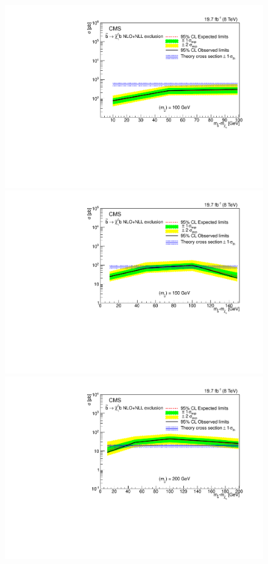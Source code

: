\begin{figure}[!Hhtb]
  \begin{center}
  \includegraphics[scale=0.39]{Figures/sus13009/sbottomlimits/Limit_100.pdf}
  \includegraphics[scale=0.39]{Figures/sus13009/sbottomlimits/Limit_150.pdf}
  \includegraphics[scale=0.39]{Figures/sus13009/sbottomlimits/Limit_200.pdf}

\end{center}
\end{figure}
